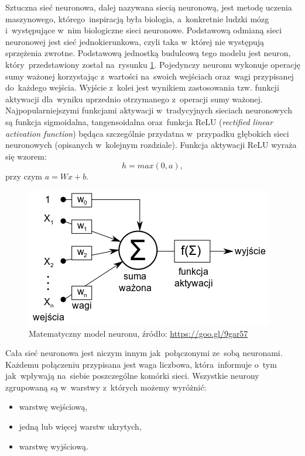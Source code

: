 Sztuczna sieć neuronowa, dalej nazywana siecią neuronową, jest metodę uczenia maszynowego, którego~inspiracją była biologia, a~konkretnie ludzki mózg i~występujące w~nim biologiczne sieci neuronowe. Podstawową odmianą sieci neuronowej jest sieć jednokierunkowa, czyli taka w~której nie występują sprzężenia zwrotne. Podstawową jednostką budulcową tego modelu jest neuron, który~przedstawiony został na~rysunku \ref{neuron}. Pojedynczy neuronu wykonuje operację sumy ważonej korzystając z~wartości na~swoich wejściach oraz~wagi przypisanej do~każdego wejścia. Wyjście z~kolei jest wynikiem zastosowania tzw. funkcji aktywacji dla~wyniku uprzednio otrzymanego z~operacji sumy ważonej. Najpopularniejszymi funkcjami aktywacji w~tradycyjnych sieciach neuronowych są funkcja sigmoidalna, tangensoidalna oraz~funkcja ReLU (\textit{rectified linear activation function}) będąca szczególnie przydatna w~przypadku głębokich sieci neuronowych (opisanych w~kolejnym rozdziale). Funkcja aktywacji ReLU wyraża się wzorem:
\begin{equation}
h=max(0,a),
\end{equation}
 przy czym $a=Wx+b$.
 
\begin{figure}[ht!]
\centering
\includegraphics{res/neuron.png}
\caption[Caption for LOF]{Matematyczny model neuronu, źródło: \url{https://goo.gl/9gar57}\label{neuron}}
\end{figure} 

\noindent
Cała sieć neuronowa jest niczym innym jak~połączonymi ze~sobą neuronami. Każdemu połączeniu przypisana jest waga liczbowa, która~informuje o~tym jak~wpływają na~siebie poszczególne komórki sieci. Wszystkie neurony zgrupowaną są w~warstwy z~których możemy wyróżnić:
\begin{itemize}
\item warstwę wejściową,
\item jedną lub więcej warstw ukrytych,
\item warstwę wyjściową.
\end{itemize}

